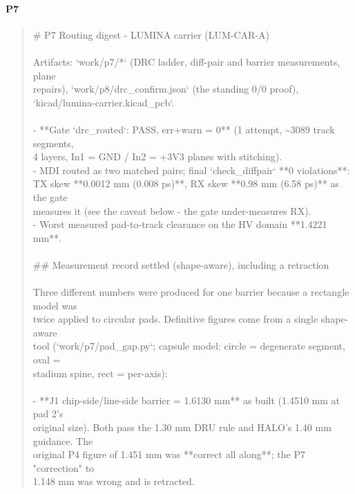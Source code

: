 \documentclass[11pt,a4paper]{article}
\begin{document}
\paragraph*{P7}
\begin{quote}\small\ttfamily\raggedright
\# P7 Routing digest - LUMINA carrier (LUM-CAR-A)\\
~\\
Artifacts: `work/p7/{*}` (DRC ladder, diff-pair and barrier measurements, plane\\
repairs), `work/p8/drc\_confirm.json` (the standing 0/0 proof),\\
`kicad/lumina-carrier.kicad\_pcb`.\\
~\\
- {*}{*}Gate `drc\_routed`: PASS, err+warn = 0{*}{*} (1 attempt, \textasciitilde{}3089 track segments,\\
  4 layers, In1 = GND / In2 = +3V3 planes with stitching).\\
- MDI routed as two matched pairs; final `check\_diffpair` {*}{*}0 violations{*}{*}:\\
  TX skew {*}{*}0.0012 mm (0.008 ps){*}{*}, RX skew {*}{*}0.98 mm (6.58 ps){*}{*} as the gate\\
  measures it (see the caveat below - the gate under-measures RX).\\
- Worst measured pad-to-track clearance on the HV domain {*}{*}1.4221 mm{*}{*}.\\
~\\
\#\# Measurement record settled (shape-aware), including a retraction\\
~\\
Three different numbers were produced for one barrier because a rectangle model was\\
twice applied to circular pads. Definitive figures come from a single shape-aware\\
tool (`work/p7/pad\_gap.py`; capsule model: circle = degenerate segment, oval =\\
stadium spine, rect = per-axis):\\
~\\
- {*}{*}J1 chip-side/line-side barrier = 1.6130 mm{*}{*} as built (1.4510 mm at pad 2's\\
  original size). Both pass the 1.30 mm DRU rule and HALO's 1.40 mm guidance. The\\
  original P4 figure of 1.451 mm was {*}{*}correct all along{*}{*}; the P7 "correction" to\\
  1.148 mm was wrong and is retracted.\\

\end{quote}
\end{document}
